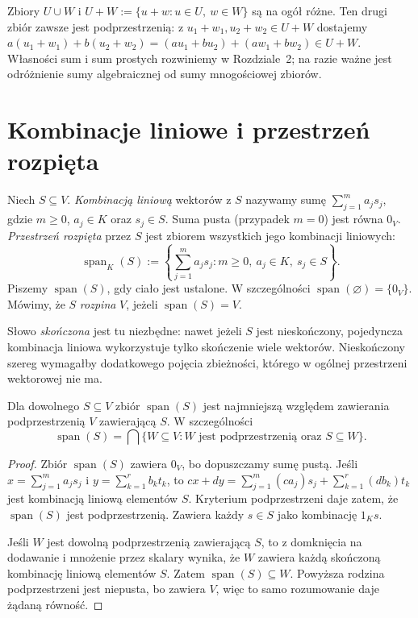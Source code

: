 \begin{uwaga}
\label{rem:lin-unia-suma}
Zbiory \(U\cup W\) i
\(U+W:=\{u+w:u\in U,\ w\in W\}\)
są na ogół różne. Ten drugi zbiór zawsze jest podprzestrzenią:
z \(u_1+w_1,u_2+w_2\in U+W\) dostajemy
\(a(u_1+w_1)+b(u_2+w_2)
=(au_1+bu_2)+(aw_1+bw_2)\in U+W\).
Własności sum i sum prostych rozwiniemy w Rozdziale~2;
na razie ważne jest odróżnienie sumy algebraicznej od sumy mnogościowej zbiorów.
\end{uwaga}

\section{Kombinacje liniowe i przestrzeń rozpięta}
\label{sec:lin-rozpietosc}

\begin{definicja}
\label{def:lin-span}
Niech \(S\subseteq V\). \emph{Kombinacją liniową}
wektorów z \(S\) nazywamy sumę
\(\sum_{j=1}^{m}a_js_j\), gdzie \(m\geq0\),
\(a_j\in K\) oraz \(s_j\in S\).
Suma pusta (przypadek \(m=0\)) jest równa \(0_V\).
\emph{Przestrzeń rozpięta} przez \(S\) jest zbiorem
wszystkich jego kombinacji liniowych:
\[
 \operatorname{span}_K(S)
   :=\left\{\sum_{j=1}^{m}a_js_j:
                    m\geq0,\ a_j\in K,\ s_j\in S\right\}.
\]
Piszemy \(\operatorname{span}(S)\), gdy ciało jest ustalone.
W szczególności \(\operatorname{span}(\varnothing)=\{0_V\}\).
Mówimy, że \(S\) \emph{rozpina} \(V\), jeżeli
\(\operatorname{span}(S)=V\).
\end{definicja}

Słowo \emph{skończona} jest tu niezbędne:
nawet jeżeli \(S\) jest nieskończony, pojedyncza
kombinacja liniowa wykorzystuje tylko skończenie wiele wektorów.
Nieskończony szereg wymagałby dodatkowego pojęcia zbieżności,
którego w ogólnej przestrzeni wektorowej nie ma.

\begin{twierdzenie}
\label{thm:lin-span-minimalny}
Dla dowolnego \(S\subseteq V\) zbiór
\(\operatorname{span}(S)\) jest najmniejszą względem
zawierania podprzestrzenią \(V\) zawierającą \(S\).
W szczególności
\[
 \operatorname{span}(S)
 =\bigcap\{W\subseteq V:W\text{ jest podprzestrzenią oraz }S\subseteq W\}.
\]
\end{twierdzenie}
\begin{proof}
Zbiór \(\operatorname{span}(S)\) zawiera \(0_V\), bo dopuszczamy
sumę pustą. Jeśli \(x=\sum_{j=1}^m a_js_j\)
i \(y=\sum_{k=1}^r b_kt_k\), to
\(cx+dy=\sum_{j=1}^m(ca_j)s_j+\sum_{k=1}^r(db_k)t_k\)
jest kombinacją liniową elementów \(S\).
Kryterium podprzestrzeni daje zatem, że
\(\operatorname{span}(S)\) jest podprzestrzenią.
Zawiera każdy \(s\in S\) jako kombinację \(1_Ks\).

Jeśli \(W\) jest dowolną podprzestrzenią zawierającą \(S\),
to z domknięcia na dodawanie i mnożenie przez skalary
wynika, że \(W\) zawiera każdą skończoną kombinację liniową
elementów \(S\). Zatem \(\operatorname{span}(S)\subseteq W\).
Powyższa rodzina podprzestrzeni jest niepusta, bo zawiera \(V\),
więc to samo rozumowanie daje żądaną równość.
\end{proof}

